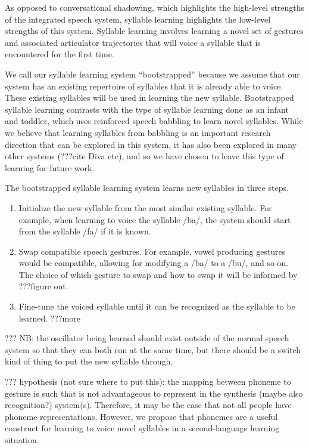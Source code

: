As opposed to conversational shadowing,
which highlights the high-level strengths
of the integrated speech system,
syllable learning highlights
the low-level strengths of this system.
Syllable learning involves
learning a novel set of gestures
and associated articulator trajectories
that will voice a syllable
that is encountered for the first time.

We call our syllable learning system ``bootstrapped''
because we assume that our system
has an existing repertoire of syllables
that it is already able to voice.
These existing syllables will be
used in learning the new syllable.
Bootstrapped syllable learning contrasts with
the type of syllable learning
done as an infant and toddler,
which uses reinforced speech babbling
to learn novel syllables.
While we believe that learning syllables
from babbling is an important research direction
that can be explored in this system,
it has also been explored in many other systems
(???cite Diva etc),
and so we have chosen to leave this type of learning
for future work.

The bootstrapped syllable learning system
learns new syllables in three steps.

\begin{enumerate}
\item Initialize the new syllable from the most
  similar existing syllable.
  For example, when learning to voice
  the syllable /ba/, the system should
  start from the syllable /fa/ if it is known.
\item Swap compatible speech gestures.
  For example, vowel producing gestures
  would be compatible, allowing for modifying
  a /ba/ to a /bu/, and so on.
  The choice of which gesture to swap and
  how to swap it will be informed by
  ???figure out.
\item Fine-tune the voiced syllable
  until it can be recognized as the
  syllable to be learned.
  ???more
\end{enumerate}

??? NB: the oscillator being learned should exist outside of
the normal speech system so that they can both run
at the same time, but there should be a switch kind of thing
to put the new syllable through.

??? hypothesis (not sure where to put this):
the mapping between phoneme to gesture
is such that is not advantageous
to represent in the synthesis
(maybe also recognition?) system(s).
Therefore, it may be the case that
not all people have phoneme representations.
However, we propose that phonemes
are a useful construct for learning to voice
novel syllables in a second-language learning situation.


